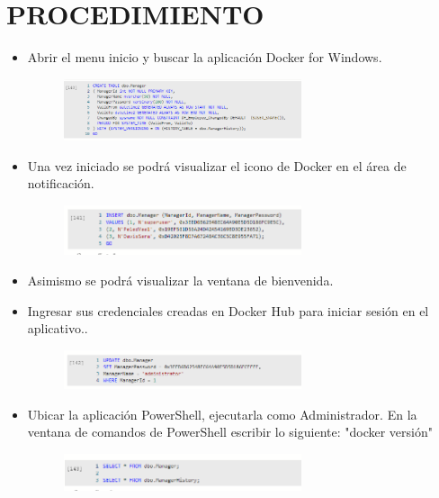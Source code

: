 \section{PROCEDIMIENTO} 

\begin{itemize}
\subsection{Parte 1: Iniciando Docker:}
	\item Abrir el menu inicio y buscar la aplicación Docker for Windows.
                    \begin{figure}[H]
		\begin{center}
		\includegraphics[width=7cm]{./Imagenes/s1}
		\end{center}
		\end{figure}
	\item Una vez iniciado se podrá visualizar el icono de Docker en el área de notificación.
   \begin{figure}[H]
		\begin{center}
		\includegraphics[width=7cm]{./Imagenes/s2}
		\end{center}
		\end{figure}
          \item Asimismo se podrá visualizar la ventana de bienvenida.
          \item Ingresar sus credenciales creadas en Docker Hub para iniciar sesión en el aplicativo..
   \begin{figure}[H]
		\begin{center}
		\includegraphics[width=7cm]{./Imagenes/s3}
		\end{center}
		\end{figure} 
          \item Ubicar la aplicación PowerShell, ejecutarla como Administrador. En la ventana de comandos de PowerShell escribir lo siguiente: "docker versión"
                       \begin{figure}[H]
		\begin{center}
		\includegraphics[width=7cm]{./Imagenes/s4}
		\end{center}
		\end{figure}   


\end{itemize}
